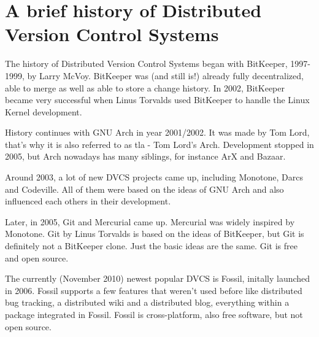 \section {A brief history of Distributed Version Control Systems} \label{dvcshistory}

The history of Distributed Version Control Systems began with BitKeeper, 1997-1999, by Larry McVoy. BitKeeper was (and still is!) already fully decentralized, able to merge as well as able to store a change history. In 2002, BitKeeper became very successful when Linus Torvalds used BitKeeper to handle the Linux Kernel development.

History continues with GNU Arch in year 2001/2002. It was made by Tom Lord, that's why it is also referred to as tla - Tom Lord's Arch. Development stopped in 2005, but Arch nowadays has many siblings, for instance ArX and Bazaar.

Around 2003, a lot of new DVCS projects came up, including Monotone, Darcs and Codeville. All of them were based on the ideas of GNU Arch and also influenced each others in their development.

Later, in 2005, Git and Mercurial came up. Mercurial was widely inspired by Monotone. Git by Linus Torvalds is based on the ideas of BitKeeper, but Git is definitely not a BitKeeper clone. Just the basic ideas are the same. Git is free and open source.

The currently (November 2010) newest popular DVCS is Fossil, initally launched in 2006. Fossil supports a few features that weren't used before like distributed bug tracking, a distributed wiki and a distributed blog, everything within a package integrated in Fossil. Fossil is cross-platform, also free software, but not open source.
\cite{understandingvcs} \cite{fossilhomepage}